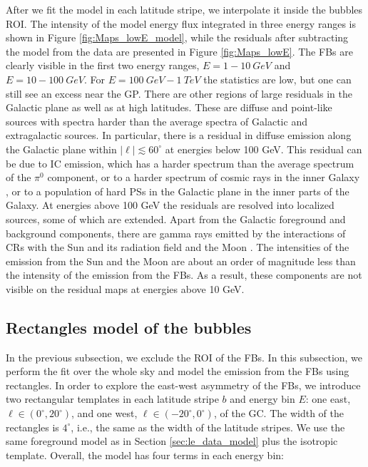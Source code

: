 After we fit the model in each latitude stripe, we interpolate it inside the bubbles ROI.
The intensity of the model energy flux integrated in three energy ranges
is shown in Figure \ref{fig:Maps_lowE_model},
while the residuals after subtracting the model from the data are presented in Figure \ref{fig:Maps_lowE}.
The FBs are clearly visible in the first two energy ranges, $E = 1 - \SI{10}{GeV}$ and $E = 10 - \SI{100}{GeV}$.
For $E = \SI{100}{GeV} - \SI{1}{TeV}$ the statistics are low, but one can still see an excess near the GP.
There are other regions of large residuals in the Galactic plane as well as at high latitudes.
These are diffuse and point-like sources with spectra harder than the average spectra of Galactic and
extragalactic sources.
In particular, there is a residual in diffuse emission along the Galactic plane within $|\ell | \lesssim 60^\circ$ at energies below 100 GeV.
This residual can be due to IC emission, which has a harder spectrum than the average spectrum of the $\pi^0$ component,
or to a harder spectrum of cosmic rays in the inner Galaxy \citep{2015PhRvD..91h3012G, 2016ApJS..223...26A, 2016PhRvD..93l3007Y},
or to a population of hard PSs in the Galactic plane in the inner parts of the Galaxy.
At energies above 100 GeV the residuals are resolved into localized sources, some of which are extended.
Apart from the Galactic foreground and background components, there are gamma rays emitted by the interactions of CRs with 
the Sun and its radiation field \citep{2011ApJ...734..116A} and the Moon \citep{2016PhRvD..93h2001A}.
The intensities of the emission from the Sun and the Moon are about an order of magnitude less than 
the intensity of the emission from the FBs. 
As a result, these components are not visible on  the residual maps at energies above 10 GeV.


\subsection{Rectangles model of the bubbles}
\label{sec:box_model}

In the previous subsection, we exclude the ROI of the FBs.
In this subsection, we perform the fit over the whole sky and model the emission from the FBs using rectangles.
In order to explore the east-west asymmetry of the FBs, 
we introduce two rectangular templates in each latitude stripe $b$ and energy bin $E$: 
one east, $\ell \in (0^\circ, 20^\circ)$, and one west, $\ell \in (-20^\circ, 0^\circ)$, of the GC.
The width of the rectangles is $4^\circ$, i.e., the same as the width of the latitude stripes.
We use the same foreground model as in Section \ref{sec:le_data_model} plus the isotropic template.
Overall, the model has four terms in each energy bin:

